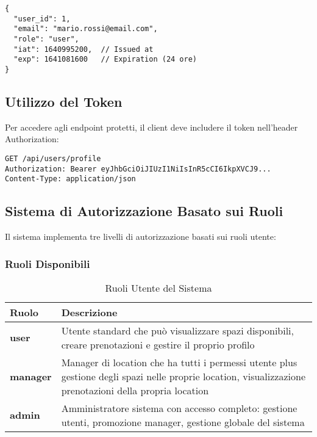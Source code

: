 \begin{lstlisting}[caption=Payload JWT Token]
{
  "user_id": 1,
  "email": "mario.rossi@email.com",
  "role": "user",
  "iat": 1640995200,  // Issued at
  "exp": 1641081600   // Expiration (24 ore)
}
\end{lstlisting}

\subsection{Utilizzo del Token}
Per accedere agli endpoint protetti, il client deve includere il token nell'header Authorization:

\begin{lstlisting}[style=httpstyle, caption=Header Authorization]
GET /api/users/profile
Authorization: Bearer eyJhbGciOiJIUzI1NiIsInR5cCI6IkpXVCJ9...
Content-Type: application/json
\end{lstlisting}

\newpage

\subsection{Sistema di Autorizzazione Basato sui Ruoli}
Il sistema implementa tre livelli di autorizzazione basati sui ruoli utente:

\subsubsection{Ruoli Disponibili}
\begin{table}[H]
\centering
\begin{tabular}{@{}lp{12cm}@{}}
\toprule
\textbf{Ruolo} & \textbf{Descrizione} \\
\midrule
\textbf{user} & Utente standard che può visualizzare spazi disponibili, creare prenotazioni e gestire il proprio profilo \\
\textbf{manager} & Manager di location che ha tutti i permessi utente plus gestione degli spazi nelle proprie location, visualizzazione prenotazioni della propria location \\
\textbf{admin} & Amministratore sistema con accesso completo: gestione utenti, promozione manager, gestione globale del sistema \\
\bottomrule
\end{tabular}
\caption{Ruoli Utente del Sistema}
\end{table}

